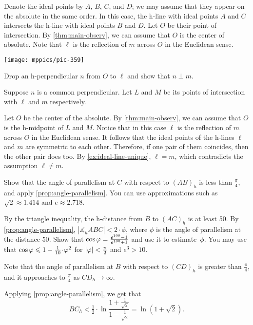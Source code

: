 Denote the ideal points by $A$, $B$, $C$, and $D$;
we may assume that they appear on the absolute in the same order.
In this case, the h-line with ideal points $A$ and $C$ intersects the h-line with ideal points $B$ and $D$.
Let $O$ be their point of intersection.
By \ref{thm:main-observ}, we can assume that $O$ is the center of absolute.
Note that $\ell$ is the reflection of $m$ across $O$ in the Euclidean sense.

\begin{Figure}
\vskip-0mm
\centering
\texttt{[image: mppics/pic-359]}
\end{Figure}

Drop an h-perpendicular $n$ from $O$ to $\ell$ and
show that $n\perp m$.

Suppose $n$ is a common perpendicular.
Let $L$ and $M$ be its points of intersection with $\ell$ and $m$ respectively.

Let $O$ be the center of the absolute.
By \ref{thm:main-observ}, we can assume that $O$ is the h-midpoint of $L$ and $M$.
Notice that in this case $\ell$ is the reflection of $m$ across $O$ in the Euclidean sense.
It follows that the ideal points of the h-lines $\ell$ and $m$ are symmetric to each other.
Therefore, if one pair of them coincides, then the other pair does too. 
By \ref{ex:ideal-line-unique}, $\ell=m$, which contradicts the assumption $\ell\ne m$.

 Show that the angle of parallelism at $C$ with respect to $(AB)_h$ is less than $\tfrac\pi4$, and apply \ref{prop:angle-parallelism}.
You can use approximations such as $\sqrt2\approx 1.414$ and $e\approx2.718$.


By the triangle inequality, the h-distance from $B$ to $(AC)_h$ is at least 50.
By \ref{prop:angle-parallelism}, $|\measuredangle_h ABC|<2\cdot\phi$, where $\phi$ is the angle of parallelism at the distance $50$.
Show that $\cos\varphi=\tfrac{e^{100}-1}{e^{100}+1}$ and
use it to estimate~$\phi$.
You may use that $\cos\phi\z\le 1-\tfrac1{10}\cdot\phi^2$ for $|\varphi|<\tfrac\pi2$ and $e^3>10$.

Note that the angle of parallelism at $B$ with respect to $(CD)_h$ is greater than $\tfrac\pi4$,
and it approaches to $\tfrac\pi4$ as $CD_h\to\infty$.

Applying \ref{prop:angle-parallelism},
we get that
$$BC_h<\tfrac12\cdot\ln\frac{1+\frac1{\sqrt{2}}}{1-\frac1{\sqrt{2}}}=\ln\left(1+\sqrt{2}\right).$$

